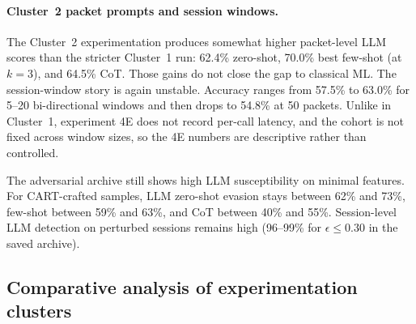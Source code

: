 \documentclass[conference]{IEEEtran}
\begin{document}
\paragraph{Cluster~2 packet prompts and session windows.}
The Cluster~2 experimentation produces somewhat higher packet-level LLM scores than the stricter Cluster~1 run: 62.4\% zero-shot, 70.0\% best few-shot (at $k=3$), and 64.5\% CoT. Those gains do not close the gap to classical ML. The session-window story is again unstable. Accuracy ranges from 57.5\% to 63.0\% for 5--20 bi-directional windows and then drops to 54.8\% at 50 packets. Unlike in Cluster~1, experiment 4E does not record per-call latency, and the cohort is not fixed across window sizes, so the 4E numbers are descriptive rather than controlled.

The adversarial archive still shows high LLM susceptibility on minimal features. For CART-crafted samples, LLM zero-shot evasion stays between 62\% and 73\%, few-shot between 59\% and 63\%, and CoT between 40\% and 55\%. Session-level LLM detection on perturbed sessions remains high (96--99\% for $\epsilon \leq 0.30$ in the saved archive). 

\subsection{Comparative analysis of experimentation clusters}
\end{document}
